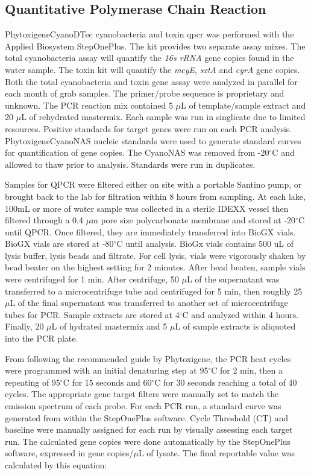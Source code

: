 \subsection{Quantitative Polymerase Chain Reaction}

Phytoxigene\texttrademark  CyanoDTec cyanobacteria and toxin \gls{qpcr} was performed with the Applied Biosystem StepOnePlus\texttrademark. The kit provides two separate assay mixes. The total cyanobacteria assay will quantify the \emph{16s rRNA} gene copies found in the water sample. The toxin kit will quantify the \emph{mcyE}, \emph{sxtA} and \emph{cyrA} gene copies.  Both the total cyanobacteria and toxin gene assay were analyzed in parallel for each month of grab samples. The primer/probe sequence is proprietary and unknown.  The PCR reaction mix contained 5 $\mu$L of template/sample extract and 20 $\mu$L of rehydrated mastermix.  Each sample was run in singlicate due to limited resources. Positive standards for target genes  were run on each PCR analysis. Phytoxigene\texttrademark  CyanoNAS nucleic standards were used to generate standard curves for quantification of gene copies. The CyanoNAS was removed from -20$^\circ$C and allowed to thaw prior to analysis.  Standards were run in duplicates.

Samples for QPCR were filtered either on site with a portable Santino pump, or brought back to the lab for filtration within 8 hours from sampling.
At each lake, 100mL or more of water sample was collected in a sterile IDEXX vessel then filtered through a 0.4 $\mu$m pore size polycarbonate membrane  and stored at -20$^\circ$C until QPCR. Once filtered, they are immediately transferred into BioGX vials. BioGX vials are stored at -80$^\circ$C until analysis. BioGx vials contains 500 uL of lysis buffer, lysis beads and filtrate. For cell lysis, vials were vigorously shaken by bead beater on the highest setting for 2 minutes. After bead beaten, sample vials were centrifuged for 1 min. After centrifuge, 50 $\mu$L of the supernatant was transferred to a microcentrifuge tube and centrifuged for 5 min, then roughly 25 $\mu$L of the final supernatant was transferred to another set of microcentrifuge tubes for PCR.  Sample extracts are stored at 4$^\circ$C and analyzed within 4 hours. Finally, 20 $\mu$L of hydrated mastermix and 5 $\mu$L of sample extracts is aliquoted into the PCR plate.

From following the recommended guide by Phytoxigene, the PCR heat cycles were programmed with an initial denaturing step at 95$^\circ$C for 2 min, then a repeating of 95$^\circ$C for 15 seconds and 60$^\circ$C for 30 seconds reaching a total of 40 cycles. The appropriate gene target filters were manually set to match the emission spectrum of each probe. For each PCR run, a standard curve was generated  from within the StepOnePlus software. Cycle Threshold (CT) and baseline were manually assigned for each run by visually assessing each target run. The calculated gene copies were done automatically by the StepOnePlus software, expressed in gene copies/$\mu$L of lysate. The final reportable value was calculated by this equation:


